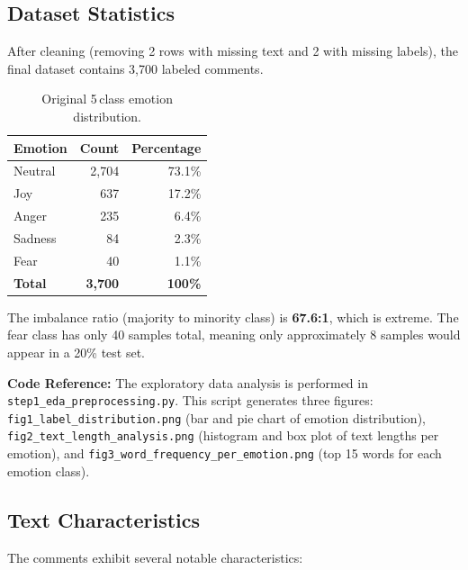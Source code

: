 \documentclass[12pt,a4paper,twoside]{article}
\theoremstyle{definition}
\begin{document}
\subsection{Dataset Statistics}

After cleaning (removing 2 rows with missing text and 2 with missing labels), the final dataset contains 3{,}700 labeled comments.

\begin{table}[h]
\centering
\caption{Original 5\,class emotion distribution.}
\label{tab:dist5}
\begin{tabular}{lrr}
\toprule
\textbf{Emotion} & \textbf{Count} & \textbf{Percentage} \\
\midrule
Neutral & 2{,}704 & 73.1\% \\
Joy & 637 & 17.2\% \\
Anger & 235 & 6.4\% \\
Sadness & 84 & 2.3\% \\
Fear & 40 & 1.1\% \\
\midrule
\textbf{Total} & \textbf{3{,}700} & \textbf{100\%} \\
\bottomrule
\end{tabular}
\end{table}

The imbalance ratio (majority to minority class) is \textbf{67.6:1}, which is extreme. The fear class has only 40 samples total, meaning only approximately 8 samples would appear in a 20\% test set.

\begin{filebox}
\textbf{Code Reference:} The exploratory data analysis is performed in \texttt{step1\_eda\_preprocessing.py}. This script generates three figures: \texttt{fig1\_label\_distribution.png} (bar and pie chart of emotion distribution), \texttt{fig2\_text\_length\_analysis.png} (histogram and box plot of text lengths per emotion), and \texttt{fig3\_word\_frequency\_per\_emotion.png} (top 15 words for each emotion class).
\end{filebox}

\subsection{Text Characteristics}

The comments exhibit several notable characteristics:
\end{document}
